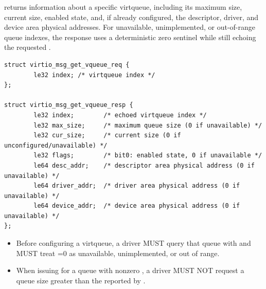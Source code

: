 
 returns information about a specific virtqueue, including
its maximum size, current size, enabled state, and, if already configured, the
descriptor, driver, and device area physical addresses. For unavailable,
unimplemented, or out-of-range queue indexes, the response uses a
deterministic zero sentinel while still echoing the requested .

\begin{lstlisting}
struct virtio_msg_get_vqueue_req {
        le32 index; /* virtqueue index */
};

struct virtio_msg_get_vqueue_resp {
        le32 index;        /* echoed virtqueue index */
        le32 max_size;     /* maximum queue size (0 if unavailable) */
        le32 cur_size;     /* current size (0 if unconfigured/unavailable) */
        le32 flags;        /* bit0: enabled state, 0 if unavailable */
        le64 desc_addr;    /* descriptor area physical address (0 if unavailable) */
        le64 driver_addr;  /* driver area physical address (0 if unavailable) */
        le64 device_addr;  /* device area physical address (0 if unavailable) */
};
\end{lstlisting}

\begin{itemize}
  \item Before configuring a virtqueue, a driver MUST query that queue with
         and MUST treat =0 as unavailable,
        unimplemented, or out of range.
  \item When issuing  for a queue with nonzero
        , a driver MUST NOT request a queue size greater than
        the  reported by .
\end{itemize}

